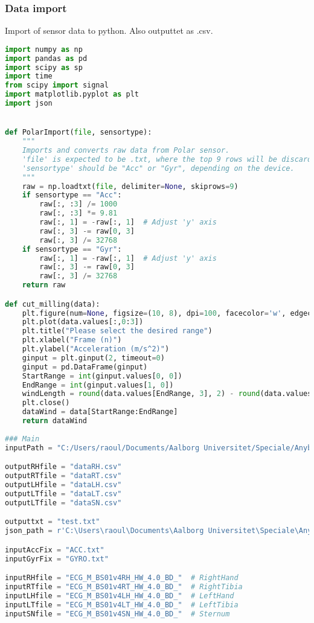 \subsubsection{Data import}
Import of sensor data to python. Also outputtet as .csv.
\begin{lstlisting}[language=Python]
import numpy as np
import pandas as pd
import scipy as sp
import time
from scipy import signal
import matplotlib.pyplot as plt
import json


def PolarImport(file, sensortype):
    """
    Imports and converts raw data from Polar sensor.
    'file' is expected to be .txt, where the top 9 rows will be discarded.
    'sensortype' should be "Acc" or "Gyr", depending on the device.
    """
    raw = np.loadtxt(file, delimiter=None, skiprows=9) 
    if sensortype == "Acc":
        raw[:, :3] /= 1000
        raw[:, :3] *= 9.81
        raw[:, 1] = -raw[:, 1]  # Adjust 'y' axis
        raw[:, 3] -= raw[0, 3]
        raw[:, 3] /= 32768
    if sensortype == "Gyr":
        raw[:, 1] = -raw[:, 1]  # Adjust 'y' axis
        raw[:, 3] -= raw[0, 3]
        raw[:, 3] /= 32768
    return raw

def cut_milling(data):
    plt.figure(num=None, figsize=(10, 8), dpi=100, facecolor='w', edgecolor='k' )
    plt.plot(data.values[:,0:3])
    plt.title("Please select the desired range")
    plt.xlabel("Frame (n)")
    plt.ylabel("Acceleration (m/s^2)") 
    ginput = plt.ginput(2, timeout=0)
    ginput = pd.DataFrame(ginput)
    StartRange = int(ginput.values[0, 0])
    EndRange = int(ginput.values[1, 0])
    windLength = round(data.values[EndRange, 3], 2) - round(data.values[StartRange, 3], 2)
    plt.close()
    dataWind = data[StartRange:EndRange]
    return dataWind
    
### Main   
inputPath = "C:/Users/raoul/Documents/Aalborg Universitet/Speciale/AnybodyPolar/pca-driven-model/Data/Data_milling_machine/SecondTestX4/Raw/"

outputRHfile = "dataRH.csv"
outputRTfile = "dataRT.csv"
outputLHfile = "dataLH.csv"
outputLTfile = "dataLT.csv"
outputLTfile = "dataSN.csv"

outputtxt = "test.txt"
json_path = r'C:\Users\raoul\Documents\Aalborg Universitet\Speciale\AnybodyPolar\pca-driven-model\Output\jsontest.json'

inputAccFix = "ACC.txt"
inputGyrFix = "GYRO.txt"

inputRHfile = "ECG_M_BS01v4RH_HW_4.0_BD_"  # RightHand
inputRTfile = "ECG_M_BS01v4RT_HW_4.0_BD_"  # RightTibia
inputLHfile = "ECG_M_BS01v4LH_HW_4.0_BD_"  # LeftHand
inputLTfile = "ECG_M_BS01v4LT_HW_4.0_BD_"  # LeftTibia
inputSNfile = "ECG_M_BS01v4SN_HW_4.0_BD_"  # Sternum


\end{lstlisting}
